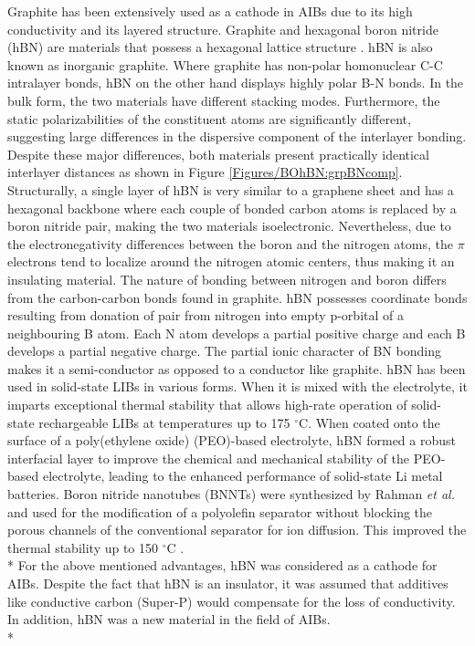 Graphite has been extensively used as a cathode in AIBs due to its high conductivity and its layered structure. Graphite and hexagonal boron nitride (hBN) are materials that possess a hexagonal lattice structure \cite{hod_graphite_2012}. hBN is also known as inorganic graphite. Where graphite has non-polar homonuclear C-C intralayer bonds, hBN on the other hand displays highly polar B-N bonds. In the bulk form, the two materials have different stacking modes. Furthermore, the static polarizabilities of the constituent atoms are significantly different, suggesting large differences in the dispersive component of the interlayer bonding\cite{song_large_2010, zeng_white_2010}. Despite these major differences, both materials present practically identical interlayer distances as shown in  Figure \ref{Figures/BOhBN:grpBNcomp}. Structurally, a single layer of hBN is very similar to a graphene sheet and has a hexagonal backbone where each couple of bonded carbon atoms is replaced by a boron nitride pair, making the two materials isoelectronic. Nevertheless, due to the electronegativity differences between the boron and the nitrogen atoms, the $\pi$ electrons tend to localize around the nitrogen atomic centers, thus making it an insulating material. The nature of bonding between nitrogen and boron differs from the carbon-carbon bonds found in graphite. hBN possesses coordinate bonds resulting from donation of  pair from nitrogen into empty p-orbital of a neighbouring B atom. Each N atom develops a partial positive charge and each B develops a partial negative charge. The partial ionic character of BN bonding makes it a semi-conductor as opposed to a conductor like graphite. hBN has been used in solid-state LIBs in various forms. When it is mixed with the electrolyte, it imparts exceptional thermal stability that allows high-rate operation of solid-state rechargeable LIBs at temperatures up to 175 $^{\circ}$C\cite{hyun_high-modulus_2019}. When coated onto the surface of a poly(ethylene oxide) (PEO)-based electrolyte, hBN formed a robust interfacial layer to improve the chemical and mechanical stability of the PEO-based electrolyte, leading to the enhanced performance of solid-state Li metal batteries\cite{shen_chemically_2019}. Boron nitride nanotubes (BNNTs) were synthesized by Rahman \textit{et al.} and used for the modification of a polyolefin separator without blocking the porous channels of the conventional separator for  ion diffusion. This improved the thermal stability up to 150 $^{\circ}$C \cite{rahman_high_2019}.\\*
For the above mentioned advantages, hBN was considered as a cathode for AIBs. Despite the fact that hBN is an insulator, it was assumed that additives like conductive carbon (Super-P) would compensate for the loss of conductivity. In addition, hBN was a new material in the field of AIBs.\\* 

